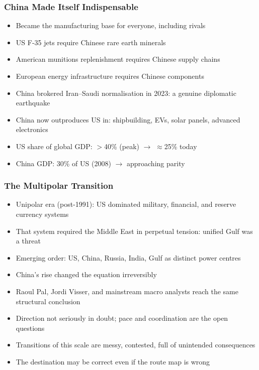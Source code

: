 \begin{frame}[fragile]\frametitle{China Made Itself Indispensable}
  \begin{itemize}
    \item Became the manufacturing base for everyone, including rivals
    \item US F-35 jets require Chinese rare earth minerals
    \item American munitions replenishment requires Chinese supply chains
    \item European energy infrastructure requires Chinese components
    \item China brokered Iran--Saudi normalisation in 2023: a genuine diplomatic earthquake
    \item China now outproduces US in: shipbuilding, EVs, solar panels, advanced electronics
    \item US share of global GDP: $>$40\% (peak) $\to$ $\approx$25\% today
    \item China GDP: 30\% of US (2008) $\to$ approaching parity
  \end{itemize}
\end{frame}

\begin{frame}[fragile]\frametitle{The Multipolar Transition}
  \begin{itemize}
    \item Unipolar era (post-1991): US dominated military, financial, and reserve currency systems
    \item That system required the Middle East in perpetual tension: unified Gulf was a threat
    \item Emerging order: US, China, Russia, India, Gulf as distinct power centres
    \item China's rise changed the equation irreversibly
    \item Raoul Pal, Jordi Visser, and mainstream macro analysts reach the same structural conclusion
    \item Direction not seriously in doubt; pace and coordination are the open questions
    \item Transitions of this scale are messy, contested, full of unintended consequences
    \item The destination may be correct even if the route map is wrong
  \end{itemize}
\end{frame}

